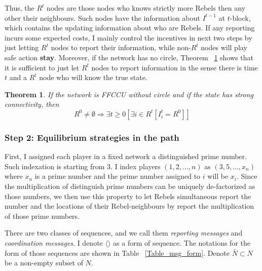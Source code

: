 \documentclass[12pt,letter]{article}
\newtheorem{theorem}{Theorem}
\theoremstyle{definition}
\theoremstyle{remark}
\theoremstyle{claim}
\begin{document}
Thus, the $R^t$ nodes are those nodes who knows strictly more Rebels then any other their neighbours. Such nodes have the information about $I^{t-1}$ at $t$-block, which contains the updating information about who are Rebels. If any reporting incurs some expected costs, I mainly control the incentives in next two steps by just letting $R^t$ nodes to report their information, while non-$R^t$ nodes will play safe action \textbf{stay}. Moreover, if the network has no circle, Theorem ~\ref{lemma_empty} shows that it is sufficient to just let $R^t$ nodes to report information in the sense there is time $t$ and a $R^t$ node who will know the true state. 
\begin{theorem}
\label{lemma_empty}
If the network is FFCCU without circle and if the state has strong connectivity, then 
\[R^0\neq \emptyset \Rightarrow \exists t\geq 0[\exists i\in R^t[I^t_i=R^0]]\]
\end{theorem}



\subsubsection{Step 2: Equilibrium strategies in the path}


First, I assigned each player in a fixed network a distinguished prime number. Such indexation is starting from $3$. I index players $(1,2,...,n)$ as $(3,5,...,x_n)$ where $x_n$ is a prime number and the prime number assigned to $i$ will be $x_i$. Since the multiplication of distinguish prime numbers can be uniquely de-factorized as those numbers, we then use this property to let Rebels simultaneous report the number and the locations of their Rebel-neighbours by report the multiplication of those prime numbers.

There are two classes of sequences, and we call them \textit{reporting messages} and \textit{coordination messages}. I denote $\langle\rangle$ as a form of sequence. The notations for the form of those sequences are shown in Table ~\ref{Table_msg_form}. Denote $\bar{N}\subset N$ be a non-empty subset of $N$.
\end{document}

